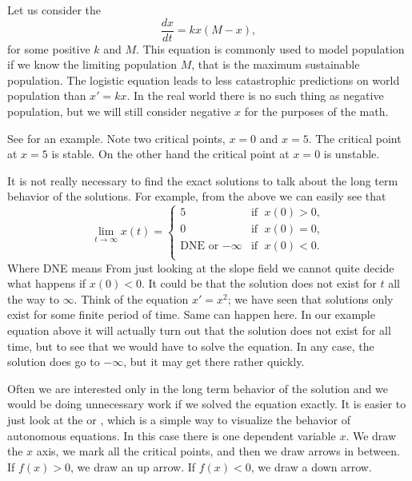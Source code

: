 \documentclass[12pt]{book}
\begin{document}
\medskip

Let us consider the \emph{}
\begin{equation*}
\frac{dx}{dt} = kx(M-x) ,
\end{equation*}
for some positive $k$ and $M$.  This equation is commonly used to model
population if we know the limiting population $M$, that is the maximum
sustainable population.  The logistic equation leads to 
less catastrophic
predictions on world population than $x'=kx$.  In the real world there is no
such thing as negative population, but we will still consider negative $x$ for
the purposes of the math.

See  for an example.
Note two critical points, $x=0$ and $x=5$.  The critical point
at $x=5$ is stable.  On the other hand the critical point at $x=0$ is
unstable.

It is not really necessary to find the exact solutions to talk about the long
term behavior of the solutions.  For example, from the above we can easily
see that
\begin{equation*}
\lim_{t\to \infty} x(t) = 
\begin{cases}
5 & \text{if } \; x(0) > 0 , \\
0 & \text{if } \; x(0) = 0 , \\
\text{DNE or } {-\infty} & \text{if } \; x(0) < 0 . \\
\end{cases}
\end{equation*}
Where DNE means   From just looking at the slope field we
cannot quite decide what happens if $x(0) < 0$.  It could be that the
solution does not exist for $t$ all the way to $\infty$.
Think of the equation $x' = x^2$; we
have seen that solutions only exist for some finite period of time.  Same can happen
here.  In our example equation above it will actually turn out that the
solution does not exist for all time, but to see that we would have to solve
the equation.  In any case, the solution does go to $-\infty$, but it may get
there rather quickly.



Often we are interested only in the long term behavior of the solution and
we would be doing unnecessary work if we solved the
equation exactly.
It is easier to just look at the \emph{} or
\emph{}, which is a simple
way to visualize the behavior of
autonomous equations.  In this case there is one dependent variable $x$.
We draw the $x$ axis, we mark all the critical points,
and then we draw arrows in
between.  If $f(x) > 0$, we draw an up arrow.  If $f(x) < 0$, we draw 
a down arrow.
\end{document}
